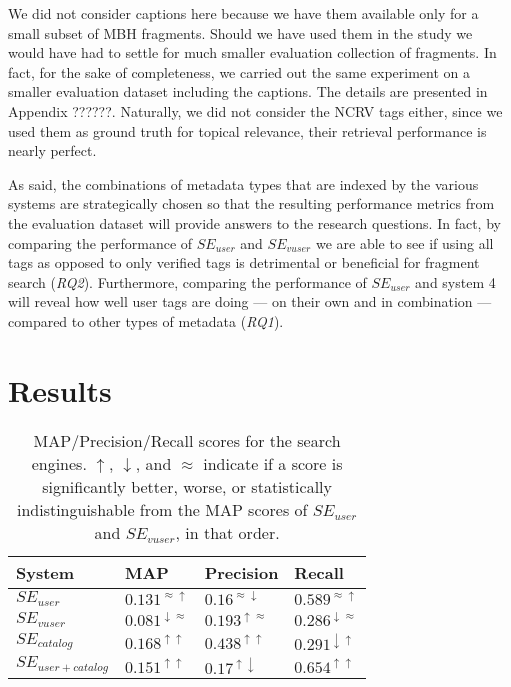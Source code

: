We did not consider captions here because we have them available only for a small subset of MBH fragments. Should we have used them in the study we would have had to settle for much smaller evaluation collection of fragments. In fact, for the sake of completeness, we carried out the same experiment on a smaller evaluation dataset including the captions. The details are presented in Appendix ??????. Naturally, we did not consider the NCRV tags either, since we used them as ground truth for topical relevance, their retrieval performance is nearly perfect.

As said, the combinations of metadata types that are indexed by the various systems are strategically chosen so that the resulting performance metrics from the evaluation dataset will provide answers to the research questions. In fact, by comparing the performance of $SE_{user}$ and $SE_{vuser}$ we are able to see if using all tags as opposed to only verified tags is detrimental or beneficial for fragment search (\textit{RQ2}). Furthermore, comparing the performance of $SE_{user}$ and system 4 will reveal how well user tags are doing --- on their own and in combination --- compared to other types of metadata (\textit{RQ1}).

\section{Results}\label{sec:topicir:results}

\begin{table}[tb]
\centering
\begin{footnotesize}
\begin{tabular}{l|l|l|l}
\toprule
System & MAP & Precision & Recall \\
\hline
$SE_{user}$ & $0.131^{\approx \uparrow}$ & $0.16^{\approx \downarrow}$ & $0.589^{\approx \uparrow}$ \\
\hline
$SE_{vuser}$ & $0.081^{\downarrow \approx}$ & $0.193^{\uparrow \approx}$ & $0.286^{\downarrow \approx}$ \\
\hline
$SE_{catalog}$ & $0.168^{\uparrow \uparrow}$ & $0.438^{\uparrow \uparrow}$ &	$0.291^{\downarrow \uparrow}$ \\
\hline
$SE_{user+catalog}$ & $0.151^{\uparrow \uparrow}$ & $0.17^{\uparrow \downarrow}$ & $0.654^{\uparrow \uparrow}$ \\
\bottomrule
\end{tabular}
\caption{MAP/Precision/Recall scores for the search engines. $\uparrow$, $\downarrow$, and $\approx$ indicate if a score is significantly better, worse, or statistically indistinguishable from the MAP scores of $SE_{user}$ and $SE_{vuser}$, in that order.}
\label{topicir:table:map-prec-rec}
\end{footnotesize}
\end{table}

